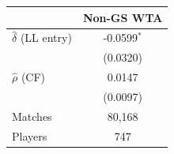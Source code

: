 \begin{tabular}{lc}
\toprule
 & Non-GS WTA \\
\midrule
$\hat{\delta}$ (LL entry) & -0.0599$^{*}$ \\
 & (0.0320) \\
$\hat{\rho}$ (CF) & 0.0147 \\
 & (0.0097) \\
\midrule
Matches & 80,168 \\
Players & 747 \\
\bottomrule
\end{tabular}
